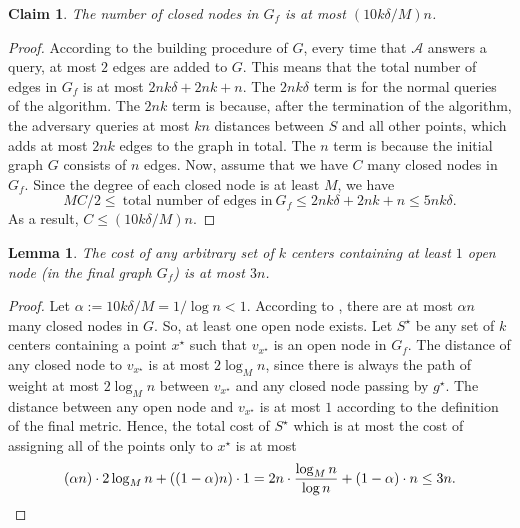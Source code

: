 \documentclass[11pt]{article}
\newcommand{\1}{\mathmybb{1}}
\newtheorem{lemma}[theorem]{Lemma}
\newtheorem{claim}[theorem]{Claim}
\newcommand{\adv}[0]{\mathcal{A}}
\begin{document}
\begin{claim}\label{lem:number-of-closed-nodes}
    The number of closed nodes in $G_f$ is at most $(10k\delta/M)n$.
\end{claim}

\begin{proof}
    According to the building procedure of $G$, every time that $\adv$ answers a query, at most $2$ edges are added to $G$.
    This means that the total number of edges in $G_f$ is at most $2nk\delta + 2nk + n$.
    The $2nk\delta$ term is for the normal queries of the algorithm.
    The $2nk$ term is because, after the termination of the algorithm, the adversary queries at most $kn$ distances between $S$ and all other points, which adds at most $2nk$ edges to the graph in total. 
    The $n$ term is because the initial graph $G$ consists of $n$ edges. 
    Now, assume that we have $C$ many closed nodes in $G_f$.
    Since the degree of each closed node is at least $M$, we have
    $$ MC/2 \leq \ \text{total number of edges in} \ G_f \leq 2nk\delta + 2nk + n \leq 5nk\delta. $$
    As a result, $C \leq (10k\delta/M)n $.
\end{proof}


\begin{lemma}\label{lem:upper-bound-on-optimum-k-median}
    The cost of any arbitrary set of $k$ centers containing at least $1$ open node (in the final graph $G_f$) is at most $3n$.
\end{lemma}

\begin{proof}
    Let $\alpha := 10k\delta/M = 1/\log n < 1$.
    According to , there are at most $\alpha n$ many closed nodes in $G$. So, at least one open node exists. Let $S^\star$ be any set of $k$ centers containing a point $x^\star$ such that $v_{x^\star}$ is an open node in $G_f$.
    The distance of any closed node to $v_{x^\star}$ is at most $2\log_M n$, since there is always the path of weight at most $2\log_M n$ between $v_{x^\star}$ and any closed node passing by $g^\star$.
    The distance between any open node and $v_{x^\star}$ is at most $1$ according to the definition of the final metric.
    Hence, the total cost of $S^\star$ which is at most the cost of assigning all of the points only to $x^\star$ is at most
    $$(\alpha n) \cdot 2\log_M n + ((1-\alpha)n) \cdot 1 = 2n \cdot \frac{\log_M n}{\log n} + (1-\alpha) \cdot n \leq 3n.\qedhere $$
\end{proof}
\end{document}
